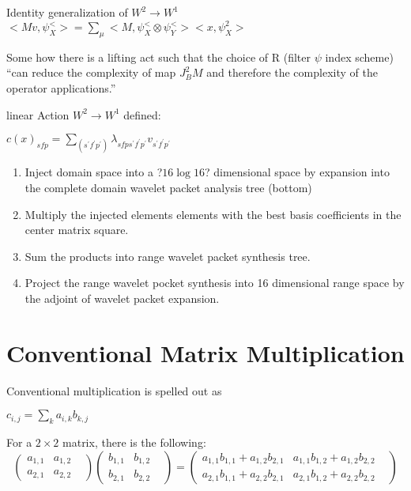 \documentclass[11pt]{book}
\begin{document}
Identity generalization of $W^2 \to W^1$  
$<Mv,\psi^<_X > = \sum_\mu <M, \psi^<_X \otimes \psi^<_Y><x,\psi^2_X>$

Some how there is a lifting act such that the choice of R (filter $\psi$ index scheme) ``can reduce the complexity of map $J^2_B M$ and therefore the complexity of the operator applications.''

linear Action $W^2\to W^1$ defined: 

$c(x)_{sfp} = \sum\limits_{(s^\prime f^\prime p^\prime )} \lambda_{sfp s^\prime f^\prime p^\prime} v_{s^\prime f^\prime p^\prime }$

\begin{enumerate}
\item Inject domain space into a ?$16\log 16$? dimensional space by expansion into the complete domain wavelet packet analysis tree (bottom)
\item Multiply the injected elements elements with the best basis coefficients in the center matrix square.
\item Sum the products into range wavelet packet synthesis tree.
\item Project the range wavelet pocket synthesis into 16 dimensional range space by the adjoint of wavelet packet expansion.  
\end{enumerate}

\section {Conventional Matrix Multiplication}
Conventional multiplication is spelled out as

$c_{i,j} = \sum\limits_k a_{i,k} b_{k,j}$

For a $2 \times 2$ matrix, there is the following:
\[
\left(
\begin{array}{ccc}
  a_{1,1}&  a_{1,2} &   \\
 a_{2,1} &  a_{2,2} &   
\end{array}
\right)
\left(
\begin{array}{ccc}
  b_{1,1}&  b_{1,2} &   \\
 b_{2,1} &  b_{2,2} &   
\end{array}
\right) =
\left(
\begin{array}{ccc}
  a_{1,1} b_{1,1} + a_{1,2} b_{2,1}&  a_{1,1}b_{1,2} + a_{1,2}  b_{2,2} &   \\
 a_{2,1} b_{1,1} + a_{2,2} b_{2,1} &  a_{2,1} b_{1,2} + a_{2,2} b_{2,2} &   
\end{array}
\right)
\]
\end{document}
